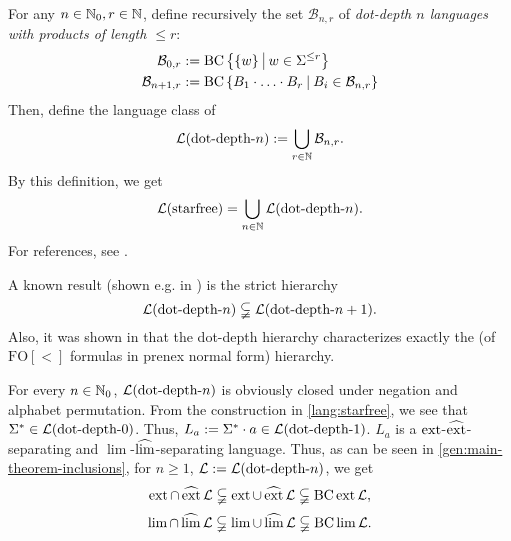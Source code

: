 For any $n \in \mathbb{N}_0, r \in \mathbb{N}$, define recursively the set $\mathcal{B}_{n,r}$ of \emph{dot-depth $n$ languages with products of length $\le r$}:
\begin{align*}
\mathcal{B}_{0,r} & := \BC \Set{\Set{w}}{w \in \Sigma^{\le r}} \\
\mathcal{B}_{n+1,r} & := \BC \Set{B_1 \cdot \dotsc \cdot B_r}{B_i \in \mathcal{B}_{n,r}}
\end{align*}
Then, define the language class of 
\[ \mathcal{L}(\textup{\textrm{dot-depth-$n$}}) := \bigcup_{r\in\mathbb{N}} \mathcal{B}_{n,r} . \]
By this definition, we get
\[ \mathcal{L}(\textup{\textrm{starfree}}) = \bigcup_{n\in\mathbb{N}} \mathcal{L}(\textup{\textrm{dot-depth-$n$}}) . \]
For references, see \cite{ConcatGameDotDepth}.

A known result (shown e.g. in \cite{ConcatGameDotDepth}) is the strict hierarchy
\[ \mathcal{L}(\textup{\textrm{dot-depth-$n$}}) \subsetneqq \mathcal{L}(\textup{\textrm{dot-depth-$n+1$}}). \]
Also, it was shown in \cite{RegEvTho82} that the dot-depth hierarchy characterizes exactly the  (of $\mathrm{FO[<]}$ formulas in prenex normal form) hierarchy.

For every $n\in\mathbb{N}_0$, $\mathcal{L}(\textup{\textrm{dot-depth-$n$}})$ is obviously closed under negation and alphabet permutation. From the construction in \cref{lang:starfree}, we see that $\Sigma^* \in \mathcal{L}(\textup{\textrm{dot-depth-$0$}})$. Thus, $L_a := \Sigma^* \cdot a \in \mathcal{L}(\textup{\textrm{dot-depth-$1$}})$. $L_a$ is a $\operatorname{ext}$-$\operatorname{\widehat{ext}}$-separating and $\lim$-$\operatorname{\widehat{lim}}$-separating language. Thus, as can be seen in \cref{gen:main-theorem-inclusions}, for $n \ge 1$, $\mathcal{L} := \mathcal{L}(\textup{\textrm{dot-depth-$n$}})$, we get
\[ \operatorname{ext} \cap \operatorname{\widehat{ext}} \mathcal{L} \subsetneqq
\operatorname{ext} \cup \operatorname{\widehat{ext}} \mathcal{L} \subsetneqq
\operatorname{BC} \operatorname{ext} \mathcal{L} , \]
\[ \lim \cap \operatorname{\widehat{lim}} \mathcal{L} \subsetneqq
\lim \cup \operatorname{\widehat{lim}} \mathcal{L} \subsetneqq
\operatorname{BC} \lim \mathcal{L} . \]

